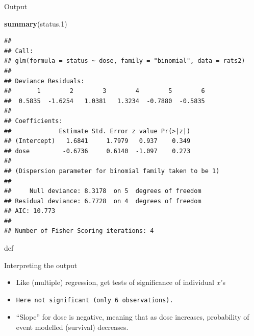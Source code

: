 \documentclass[ignorenonframetext,]{beamer}
\newenvironment{Shaded}{\begin{snugshade}}{\end{snugshade}}
\newcommand{\FloatTok}[1]{\textcolor[rgb]{0.00,0.00,0.81}{#1}}
\newcommand{\KeywordTok}[1]{\textcolor[rgb]{0.13,0.29,0.53}{\textbf{#1}}}
\newcommand{\NormalTok}[1]{#1}
\begin{document}
\begin{frame}[fragile]{Output}
\protect\hypertarget{output-2}{}

\begin{Shaded}
\begin{Highlighting}[]
\KeywordTok{summary}\NormalTok{(status}\FloatTok{.1}\NormalTok{)}
\end{Highlighting}
\end{Shaded}

\begin{verbatim}
## 
## Call:
## glm(formula = status ~ dose, family = "binomial", data = rats2)
## 
## Deviance Residuals: 
##       1        2        3        4        5        6  
##  0.5835  -1.6254   1.0381   1.3234  -0.7880  -0.5835  
## 
## Coefficients:
##             Estimate Std. Error z value Pr(>|z|)
## (Intercept)   1.6841     1.7979   0.937    0.349
## dose         -0.6736     0.6140  -1.097    0.273
## 
## (Dispersion parameter for binomial family taken to be 1)
## 
##     Null deviance: 8.3178  on 5  degrees of freedom
## Residual deviance: 6.7728  on 4  degrees of freedom
## AIC: 10.773
## 
## Number of Fisher Scoring iterations: 4
\end{verbatim}

def

\end{frame}

\begin{frame}[fragile]{Interpreting the output}
\protect\hypertarget{interpreting-the-output}{}

\begin{itemize}
\item
  Like (multiple) regression, get tests of significance of individual
  \(x\)'s
\item
\begin{verbatim}
Here not significant (only 6 observations).
\end{verbatim}
\item
  ``Slope'' for dose is negative, meaning that as dose increases,
  probability of event modelled (survival) decreases.
\end{itemize}

\end{frame}
\end{document}

